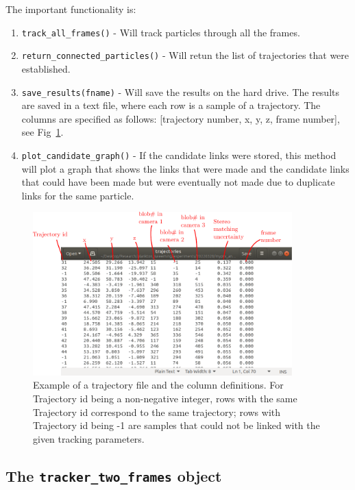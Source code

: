 \documentclass[10pt,a4paper]{article}
\begin{document}
The important functionality is:
%
\begin{enumerate}
	\item \texttt{track\_all\_frames()} - Will track particles through all the frames. 
	
	\item \texttt{return\_connected\_particles()} - Will retun the list of trajectories that were established.
	
	\item \texttt{save\_results(fname)} - Will save the results on the hard drive. The results are saved in a text file, where each row is a sample of a trajectory. The columns are specified as follows: [trajectory number, x, y, z, frame number], see Fig~\ref{fig:trajfile}.  
	
	\item \texttt{plot\_candidate\_graph()} - If the candidate links were stored, this method will plot a graph that shows the links that were made and the candidate links that could have been made but were eventually not made due to duplicate links for the same particle. 
\end{enumerate}

\begin{figure}
	\centering
	\includegraphics[width=10cm]{trajectory_files.pdf}
	\caption{Example of a trajectory file and the column definitions. For Trajectory id being a non-negative integer, rows with the same Trajectory id correspond to the same trajectory; rows with Trajectory id being -1 are samples that could not be linked with the given tracking parameters.  \label{fig:trajfile}}
\end{figure}




\subsection{The \texttt{tracker\_two\_frames} object}
\end{document}
